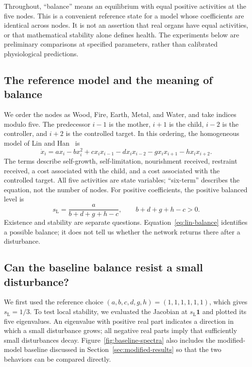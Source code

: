 \documentclass{article}
\begin{document}
Throughout, ``balance'' means an equilibrium with equal positive activities
at the five nodes. This is a convenient reference state for a model whose
coefficients are identical across nodes. It is not an assertion that real
organs have equal activities, or that mathematical stability alone defines
health. The experiments below are preliminary comparisons at specified
parameters, rather than calibrated physiological predictions.

\subsection{The reference model and the meaning of balance}
We order the nodes as Wood, Fire, Earth, Metal, and Water, and take indices
modulo five. The predecessor $i-1$ is the mother, $i+1$ is the child,
$i-2$ is the controller, and $i+2$ is the controlled target. In this
ordering, the homogeneous model of Lin and Han~\cite{Lin2020} is
\begin{equation}
 \dot x_i=a x_i-bx_i^2+c x_i x_{i-1}-d x_i x_{i-2}
                 -g x_i x_{i+1}-h x_i x_{i+2}.
 \label{eq:lin-model}
\end{equation}
The terms describe self-growth, self-limitation, nourishment received,
restraint received, a cost associated with the child, and a cost associated
with the controlled target. All five activities are state variables;
``six-term'' describes the equation, not the number of nodes.
For positive coefficients, the positive balanced level is
\begin{equation}
 s_{\mathrm L}=\frac{a}{b+d+g+h-c},
 \qquad b+d+g+h-c>0.
 \label{eq:lin-balance}
\end{equation}
Existence and stability are separate questions. Equation~\eqref{eq:lin-balance}
identifies a possible balance; it does not tell us whether the network
returns there after a disturbance.

\subsection{Can the baseline balance resist a small disturbance?}
We first used the reference choice $(a,b,c,d,g,h)=(1,1,1,1,1,1)$,
which gives $s_{\mathrm L}=1/3$. To test local stability, we evaluated
the Jacobian at $s_{\mathrm L}\mathbf{1}$ and plotted its five eigenvalues.
An eigenvalue with positive real part indicates a direction in which a
small disturbance grows; all negative real parts imply that sufficiently
small disturbances decay. Figure~\ref{fig:baseline-spectra} also includes
the modified-model baseline discussed in Section~\ref{sec:modified-results}
so that the two behaviors can be compared directly.
\end{document}
